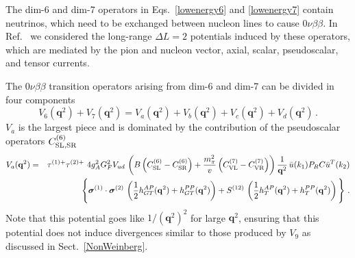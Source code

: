 \documentclass[letterpaper,11pt]{article}
\newcommand{\Dt}{\Delta}
\newcommand{\boldsigma}{\mbox{\boldmath $\sigma$}}
\renewcommand{\vec}[1]{{\mathbf #1}}
\newcommand{\sq}{^{2}}
\begin{document}
The dim-6 and dim-7 operators in Eqs.\ \eqref{lowenergy6} and \eqref{lowenergy7}
contain neutrinos, which need to be exchanged between nucleon lines to cause $0\nu\beta\beta$.
In Ref.\ \cite{Cirigliano:2017djv} we considered the long-range $\Dt L=2$ potentials induced by these operators,
which are mediated by the pion and nucleon vector, axial, scalar, pseudoscalar, and tensor currents.


The $0\nu\beta\beta$ transition operators arising from dim-6 and dim-7 can be divided in four components
\begin{equation}
V_6(\vec q^2) + V_7(\vec q^2) = V_a(\vec q^2) + V_b(\vec q^2) + V_c(\vec q^2) + V_d(\vec q^2)\,.
\end{equation}
$V_a$ is the largest piece and is dominated by the contribution of the pseudoscalar operators $C^{(6)}_{\rm SL, SR}$ 
\begin{eqnarray}\label{ps.1}
V_a(\vec q^2) =  & &  \tau^{(1) +} \tau^{(2) +} \,  \, 4g_A\sq G_F^2V_{ud} \, \left(  B  \left( C^{(6)}_{\textrm{SL}} - C^{(6)}_{\textrm{SR}} \right)  + \frac{m^2_\pi}{ v}  \left( C^{(7)}_{\textrm{VL}} - C^{(7)}_{\textrm{VR}} \right)  \right)  \frac{1}{\vec q^2} \,   \bar u(k_1) P_RC \bar u^T(k_2) \nonumber \\ 
& & \Bigg\{   \boldsigma^{(1)}\cdot \boldsigma^{(2)}  \, \left(\frac{1}{2} h^{AP}_{GT}(\vec q^2) + h^{PP}_{GT}(\vec q^2) \right)    + S^{(12)} \, \left(\frac{1}{2} h^{AP}_{T}(\vec q^2) + h^{PP}_{T}(\vec q^2) \right)  \Bigg\}\,\,.
\end{eqnarray}
Note that this potential 	goes like $1/(\vec q\sq)\sq$ for large $\vec q\sq $, ensuring that this potential does not induce divergences similar to those produced by $V_9$ as discussed in Sect.\ \ref{NonWeinberg}.
\end{document}
